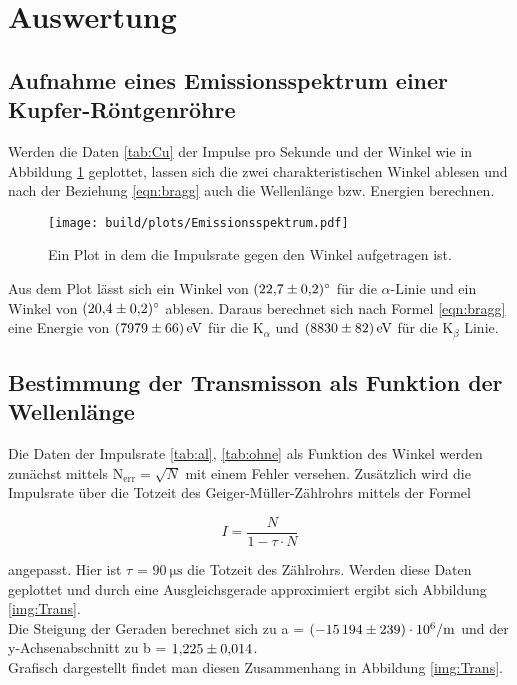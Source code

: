 \newpage
\section{Auswertung}

    \subsection{Aufnahme eines Emissionsspektrum einer Kupfer-Röntgenröhre}

        \noindent Werden die Daten \ref{tab:Cu} der Impulse pro Sekunde und der Winkel wie in Abbildung \ref{img:Spekt} geplottet, lassen sich die zwei 
        charakteristischen Winkel ablesen und nach der Beziehung \ref{eqn:bragg} auch die Wellenlänge bzw. Energien berechnen.

            \begin{figure}
                \centering
                \texttt{[image: build/plots/Emissionsspektrum.pdf]}
                \caption{Ein Plot in dem die Impulsrate gegen den Winkel aufgetragen ist.}
                \label{img:Spekt}
            \end{figure}

        \noindent Aus dem Plot lässt sich ein Winkel von $\SI{22.7 \pm 0.2}{\degree}$ für die $\alpha$-Linie und ein Winkel von $\SI{20.4 \pm 0.2}{\degree}$
        ablesen. Daraus berechnet sich nach Formel \ref{eqn:bragg} eine Energie von $\SI{7979 \pm 66}{\electronvolt}$ für die $\text{K}_{\alpha}$ und
        $\SI{8830 \pm 82}{\electronvolt}$ für die $\text{K}_{\beta}$ Linie. 

    \subsection{Bestimmung der Transmisson als Funktion der Wellenlänge}

        \noindent Die Daten der Impulsrate \ref{tab:al}, \ref{tab:ohne} als Funktion des Winkel werden zunächst mittels $\text{N}_{\text{err}}=\sqrt{N}$ mit einem Fehler versehen.
        Zusätzlich wird die Impulsrate über die Totzeit des Geiger-Müller-Zählrohrs mittels der Formel 
        
            \begin{equation}
                I = \frac{N}{1 - \tau \cdot N}
            \end{equation}
        
        \noindent angepasst. Hier ist $\tau$ = $\SI{90}{\micro\second}$ die Totzeit des Zählrohrs. Werden diese Daten geplottet und durch eine 
        Ausgleichsgerade approximiert ergibt sich Abbildung \ref{img:Trans}.\\ Die Steigung der Geraden berechnet sich zu 
        a = $\SI{-15194  (239)e6}{\per\meter}$ und der y-Achsenabschnitt zu b = $\num{1.225 \pm 0.014}$.\\
        Grafisch dargestellt findet man diesen Zusammenhang in Abbildung \ref{img:Trans}.

